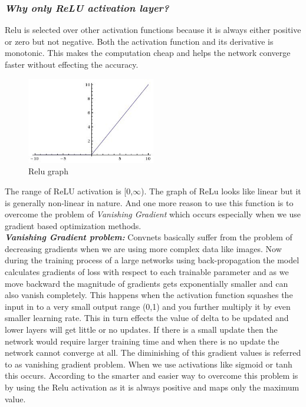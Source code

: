 \subsubsection{\textbf{\textit{Why only ReLU activation layer? }}}

Relu is selected over other activation functions because it is always either positive or zero but not negative. Both the activation function and its derivative is monotonic. This makes the computation cheap and helps the network converge faster without effecting the accuracy.
 \begin{figure}[h]
    \centering
    \includegraphics[width=0.5\textwidth]{thesis_template/images/rElu.jpg}
    \caption{\small Relu graph}
    \label{}
    \end{figure} 

\noindent The range of ReLU activation is [0,$\infty$). The graph of ReLu looks like linear but it is generally non-linear in nature.  And one more reason to use this function is to overcome the problem of \textit{Vanishing Gradient} which occurs especially when we use gradient based optimization methods.
\\ \textbf{ \textit{Vanishing Gradient problem:}} Convnets basically suffer from the problem of decreasing gradients when we are using more complex data like images. Now during the training process of a large networks using back-propagation the model calculates gradients of loss with respect to each trainable parameter and as we move backward the magnitude of gradients gets exponentially smaller and can also vanish completely. This happens when the activation function squashes the input in to a very small output range (0,1) and you further multiply it by even smaller learning rate. This in turn effects the value of delta to be updated and lower layers will get little or no updates. If there is a small update then the network would require larger training time and when there is no update the network cannot converge at all. The diminishing of this gradient values is referred to as vanishing gradient problem. When we use activations like sigmoid or tanh this occurs. According to \cite{Ide} the smarter and easier way to overcome this problem is by using the Relu activation as it is always positive and maps only the maximum value.\\ 

